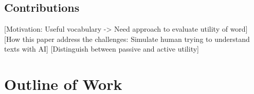 \subsection{Contributions}
[Motivation: Useful vocabulary -> Need approach to evaluate utility of word]
[How this paper address the challenges: Simulate human trying to understand texts with AI]
[Distinguish between passive and active utility]

\section{Outline of Work}

